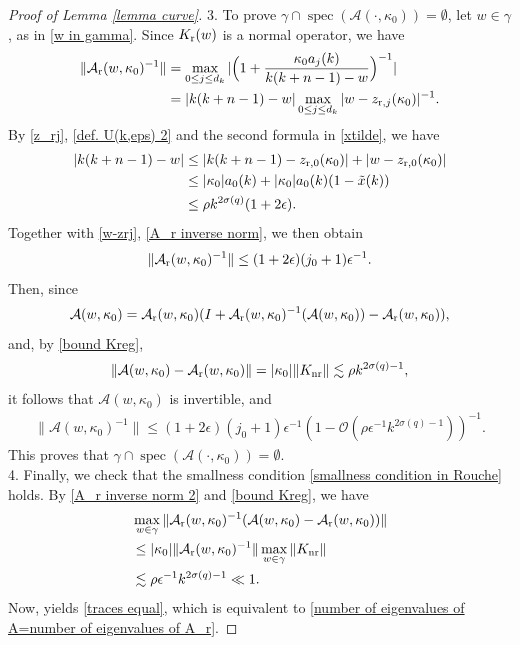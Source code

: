\documentclass[12pt]{amsart}
\newcommand\eps{\epsilon}
\DeclareMathOperator{\spec}{spec}
\begin{document}
\begin{proof}[Proof of Lemma \ref{lemma curve}]
3. To prove $\gamma\cap \spec(\mathcal{A}(\cdot,\kappa_0))=\emptyset$, let $w\in\gamma$, as in \eqref{w in gamma}. Since $K_{\rm r}(w)$ is a normal operator, we have
\begin{align}\label{A_r inverse norm}
    \|\mathcal{A}_{\rm r}(w,\kappa_0)^{-1}\|&=\max_{0\leq j\leq d_k}|\Big(1+\frac{\kappa_{0}a_j(k)}{k(k+n-1)-w}\Big)^{-1}|\\
    &=|k(k+n-1)-w|\max_{0\leq j\leq d_k}|w-z_{{\rm r},j}(\kappa_0)|^{-1}.
\end{align}
By \eqref{z_rj}, \eqref{def. U(k,eps) 2} and the 
second formula in \eqref{xtilde}, we have
\begin{align}\label{k(k+n-1)-w}
|k(k+n-1)-w|&\leq |k(k+n-1)-z_{{\rm r},0}(\kappa_{0})|+|w-z_{{\rm r},0}(\kappa_{0})|\\
&\leq  |\kappa_0| a_0(k)+|\kappa_{0}|a_0(k)(1-\tilde{x}(k))\\
&\leq \rho k^{2\sigma(q)}(1+2\eps).
\end{align}
Together with \eqref{w-zrj}, \eqref{A_r inverse norm}, we then obtain
\begin{align}\label{A_r inverse norm 2}
 \|\mathcal{A}_{\rm r}(w,\kappa_0)^{-1}\|\leq (1+2\eps)(j_0+1)\eps^{-1}.    
\end{align}
Then, since
\begin{align}
    \mathcal{A}(w,\kappa_0)=\mathcal{A}_{\rm r}(w,\kappa_0)(I+\mathcal{A}_{\rm r}(w,\kappa_0)^{-1}(\mathcal{A}(w,\kappa_0))-\mathcal{A}_{\rm r}(w,\kappa_0)),
\end{align}
and, by \eqref{bound Kreg}, 
\begin{align}
    \|\mathcal{A}(w,\kappa_0)-\mathcal{A}_{\rm r}(w,\kappa_0)\|=|\kappa_0|\|K_{\rm nr}\|
    \lesssim \rho k^{2\sigma(q)-1},
\end{align}
it follows that $\mathcal{A}(w,\kappa_0)$ is invertible, and 
\begin{align}
 \|\mathcal{A}(w,\kappa_0)^{-1}\|\leq (1+2\eps)(j_0+1)\eps^{-1}(1-\mathcal{O}(\rho\eps^{-1}k^{2\sigma(q)-1}))^{-1}.
\end{align}
This proves that $\gamma\cap \spec(\mathcal{A}(\cdot,\kappa_0))=\emptyset$.\\

4. Finally, we check that the smallness condition \eqref{smallness condition in Rouche} holds. 
By \eqref{A_r inverse norm 2} and \eqref{bound Kreg},
we have
\begin{align}
&\max_{w\in\gamma}\|\mathcal{A}_{\rm r}(w,\kappa_{0})^{-1}(\mathcal{A}(w,\kappa_{0})-\mathcal{A}_{\rm r}(w,\kappa_{0}))\|\\
&\leq |\kappa_0|\|\mathcal{A}_{\rm r}(w,\kappa_{0})^{-1}\| \max_{w\in\gamma}\|K_{\rm nr}\|\\
&\lesssim\rho\eps^{-1}k^{2\sigma(q)-1}\ll 1.
\end{align}
Now, \cite[Theorem 2.2]{MR313856} yields \eqref{traces equal}, which is equivalent to \eqref{number of eigenvalues of A=number of eigenvalues of A_r}.
\end{proof}
\end{document}
